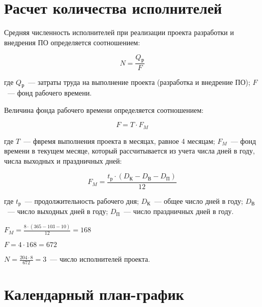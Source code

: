 \normalsize

\section{Расчет количества исполнителей}

Средняя численность исполнителей при реализации проекта разработки и внедрения ПО определяется соотношением:

\begin{equation}
N = \frac{Q_{\text{Р}}}{F}
\label{F:N}
\end{equation}

где $Q_{\text{Р}}$~--- затраты труда на выполнение проекта (разработка и внедрение ПО); $F$~--- фонд рабочего времени.

Величина фонда рабочего времени определяется соотношением:

\begin{equation}
F = T \cdot F_M
\label{F:F}
\end{equation}

где $T$~--- фвремя выполнения проекта в месяцах, равное 4 месяцам; $F_M$~--- фонд времени в текущем месяце, который рассчитывается из учета числа дней в году, числа выходных и праздничных дней:

\begin{equation}
F_M = \frac{t_{\text{р}} \cdot (D_{\text{К}} - D_{\text{В}} - D_{\text{П}})}{12}
\label{F:FM}
\end{equation}

где $t_{\text{р}}$~--- продолжительность рабочего дня; $D_{\text{К}}$~--- общее число дней в году; $D_{\text{В}}$~--- число выходных дней в году; $D_{\text{П}}$~--- число праздничных дней в году.

$F_M = \frac{8 \cdot (365 - 103 - 10)}{12} = 168$

$F = 4 \cdot 168 = 672$

$N = \frac{204 \cdot 8}{672} = 3$~--- число исполнителей проекта.

\section{Календарный план-график}

